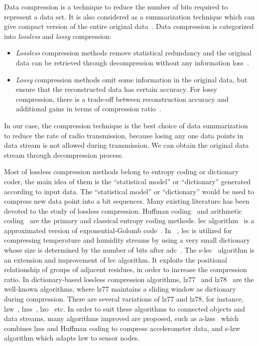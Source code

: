 Data compression is a technique to reduce the number of bits required to
represent a data set. It is also considered as a summarization technique
which can give compact version of the entire original
data~\cite{hesabi2015data}. Data compression is categorized into
\emph{lossless} and \emph{lossy} compression:
\begin{itemize}
    \item \emph{Lossless} compression methods remove statistical redundancy and
    the original data can be retrieved through decompression without any
    information loss~\cite{hesabi2015data}.
    \item \emph{Lossy} compression methods omit some information in the original
    data, but ensure that the reconstructed data has certain accuracy. For lossy
    compression, there is a trade-off between reconstruction accuracy and
    additional gains in terms of compression ratio~\cite{zordan2014performance}.
\end{itemize}

In our case, the compression technique is the best choice of data summarization
to reduce the rate of radio transmission, because losing any one data points in
data stream is not allowed during transmission. We can obtain the original data
stream through decompression process. 

Most of lossless compression methods belong to entropy coding or dictionary
coder, the main idea of them is the ``statistical model'' or ``dictionary''
generated according to input data. The ``statistical model'' or ``dictionary''
would be used to compress new data point into a bit sequences.  Many existing
literature has been devoted to the study of lossless compression. Huffman
coding~\cite{huffman1952method} and arithmetic
coding~\cite{langdon1984introduction} are the primary and classical entropy
coding methods. \acrfull{lec} algorithm~\cite{marcelloni2008simple} is a
approximated version of exponential-Golomb code~\cite{teuhola1978compression}.
In ~\cite{marcelloni2008simple}, \acrshort{lec} is utilized for compressing
temperature and humidity streams by using a very small dictionary whose size is
determined by the number of bits after
\acrfull{adc}~\cite{marcelloni2008simple,marcelloni2009efficient}. The
\acrfull{s-lec}~\cite{li2016temporal} algorithm is an extension and improvement
of \acrshort{lec} algorithm. It exploits the positional relationship of groups
of adjacent residues, in order to increase the compression ratio. In
dictionary-based lossless compression algorithms,
\acrfull{lz77}~\cite{ziv1977universal} and
\acrfull{lz78}~\cite{ziv1978compression} are the well-known algorithms, where
\acrshort{lz77} maintains a sliding window as dictionary during compression.
There are several variations of \acrshort{lz77} and \acrshort{lz78}, for
instance, \acrfull{lzw}~\cite{sadler2006data},
\acrfull{lzss}~\cite{storer1982data}, \acrfull{lzo}~\cite{lzocite} etc. In order
to suit these algorithms to connected objects and data streams, many algorithms
improved are proposed, such as \acrfull{a-lzss}~\cite{pope2018accelerometer}
which combines \acrshort{lzss} and Huffman coding to compress accelerometer
data, and \acrfull{s-lzw}~\cite{sadler2006data} algorithm which adapts
\acrshort{lzw} to sensor nodes.

